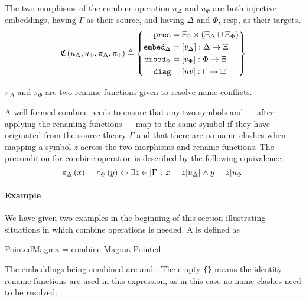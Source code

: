 The two morphisms of the combine operation $u_{\Delta}$ and $u_{\Phi}$ are both injective embeddings, having $\Gamma$ as their source, and having $\Delta$ and $\Phi$, resp, as their targets. 
\[
\mathfrak{C}\left( u_{\Delta}, u_{\Phi}, \pi_{\Delta}, \pi_{\Phi}\right) \triangleq
\left\{\begin{aligned}
\mathtt{pres} & = \Xi_0\rtimes\left(\Xi_{\Delta} \cup \Xi_{\Phi}\right) \\
\mathtt{embed}_{\Delta} & = \left[v_{\Delta}\right] : \Delta\rightarrow\Xi\\
\mathtt{embed}_{\Phi} & = \left[v_{\Phi}\right] : \Phi\rightarrow\Xi\\
\mathtt{diag} & = \left[uv\right]:\Gamma\rightarrow\Xi\\
\end{aligned}\right\}\]
 
$\pi_{\Delta}$ and $\pi_{\Phi}$ are two rename functions given to resolve name conflicts. 

\noindent A well-formed combine needs to ensure that any two symbols  and  --- after applying the renaming functions --- map to the same symbol if they have originated from the source theory $\Gamma$ and that there are no name clashes when mapping a symbol $z$ across the two morphisms and rename functions.  The precondition for combine operation is described by the following equivalence: 
\begin{equation}
\pi_{\Delta} \left( x \right) = \pi_{\Phi} \left( y \right)
\Leftrightarrow \exists z \in \left| \Gamma \right|.\ x =
z[ u_{\Delta}]_{} \wedge y = z[ u_{\Phi}]_{} 
\label{eq:combinePrecond}
\end{equation}

\paragraph{Example}
We have given two examples in the beginning of this section illustrating situations in which combine operations is needed. A  is defined as 
\begin{togcode} 
PointedMagma = combine Magma {} Pointed {} 
\end{togcode} 
The embeddings being combined are  and . The empty 
\lstinline|{}| means the identity rename functions are used in this expression, as in this case no name clashes need to be resolved. 

